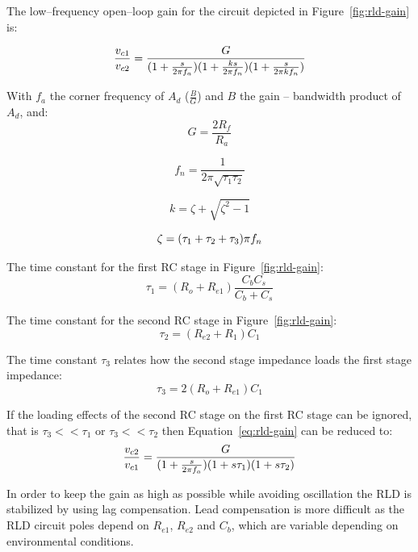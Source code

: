 The low--frequency open--loop gain for the circuit depicted in
Figure~\ref{fig:rld-gain} is:


\begin{equation}
	\frac{v_{c1}}{v_{c2}} = \frac{G}{(1 + \frac{s}{2\pi\/f_a})(1 +
	\frac{ks}{2\pi\/f_n})(1 + \frac{s}{2\pi\/kf_n})}
	\label{eq:rld-gain}
\end{equation}

With $f_a$ the corner frequency of $A_d$ ($\frac{B}{G}$) and $B$ the
gain -- bandwidth product of $A_d$, and:
\begin{equation}
	G = \frac{2R_f}{R_a}
\end{equation}

\begin{equation}
	f_n = \frac{1}{2\pi\sqrt{\tau_1\tau_2}}
\end{equation}

\begin{equation}
	k = \zeta + \sqrt{\zeta^2 - 1}
\end{equation}

\begin{equation}
	\zeta = (\tau_1 + \tau_2 + \tau_3)\pi\/f_n
\end{equation}


The time constant for the first RC stage in Figure~\ref{fig:rld-gain}:
\begin{equation}
	\tau_1 = (R_o + R_{e1})\frac{C_bC_s}{C_b + C_s}
\end{equation}

The time constant for the second RC stage in Figure~\ref{fig:rld-gain}:
\begin{equation}
	\tau_2 = (R_{e2} + R_1)C_1
\end{equation}

The time constant $\tau_3$ relates how the second stage impedance loads
the first stage impedance:
\begin{equation}
	\tau_3 = 2(R_o + R_{e1})C_1
\end{equation}

If the loading effects of the second RC stage on the first RC stage
can be ignored, that is $\tau_3 << \tau_1$ or $\tau_3 << \tau_2$ then
Equation~\ref{eq:rld-gain} can be reduced to:
\begin{equation}
	\frac{v_{c2}}{v_{c1}} = \frac{G}{(1 + \frac{s}{2\pi\/f_a})(1 +
	s\tau_1)(1 + s\tau_2)}
\end{equation}

In order to keep the gain as high as possible while avoiding
oscillation the RLD is stabilized by using lag compensation. Lead
compensation is more difficult as the RLD circuit poles depend on
$R_{e1}$, $R_{e2}$ and $C_b$, which are variable depending on
environmental conditions.


